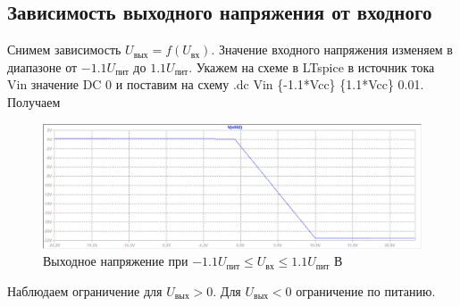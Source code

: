 \documentclass[a4paper, 12pt]{article}
\begin{document}
    \subsection{Зависимость выходного напряжения от входного}
    Снимем зависимость $U_\text{вых}=f\left( U_\text{вх} \right)$.
    Значение входного напряжения изменяем в диапазоне от $-1.1U_\text{пит}$ до $1.1U_\text{пит}$.
    Укажем на схеме в LTspice в источник тока Vin значение DC 0 и поставим на схему
    .dc Vin \{-1.1*Vcc\} \{1.1*Vcc\} 0.01. Получаем
    \begin{figure}[H]
        \centering
        \includegraphics[scale=0.46]{1task_fuin.png}
        \captionsetup{skip=0pt}
        \caption{Выходное напряжение при $-1.1U_\text{пит}\leq U_\text{вх}\leq 1.1U_\text{пит}$ В}
        \label{fig:1task_fuin}
    \end{figure}
    Наблюдаем ограничение для $U_\text{вых}>0$. Для $U_\text{вых}<0$ ограничение по питанию.
\end{document}
